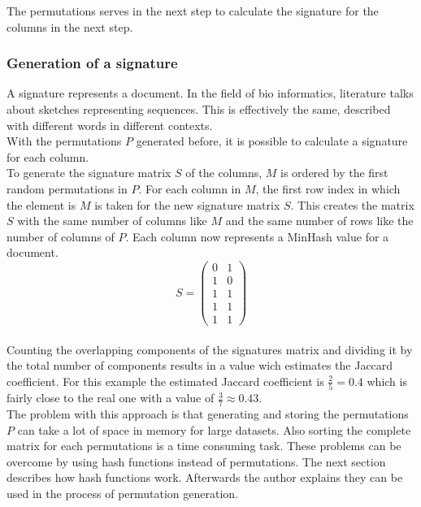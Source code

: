 The permutations serves in the next step to calculate the signature for the columns in the next step.\\

\subsubsection{Generation of a signature}

A signature represents a document. In the field of bio informatics, literature talks about sketches representing sequences. This is effectively the same, described with different words in different contexts.\\

With the permutations $ P $ generated before, it is possible to calculate a signature for each column.\\

To generate the signature matrix $ S $ of the columns, $ M $ is ordered by the first random permutations in $ P $. For each column in $ M $, the first row index in which the element is $ M $ is taken for the new signature matrix $ S $. This creates the matrix $ S $ with the same number of columns like $ M $ and the same number of rows like the number of columns of $ P $. Each column now represents a MinHash value for a document.\\

\begin{equation}
    S = 
    \begin{pmatrix}
        0 & 1 \\
        1 & 0 \\
        1 & 1 \\
        1 & 1 \\
        1 & 1
    \end{pmatrix}
\end{equation} \\

Counting the overlapping components of the signatures matrix and dividing it by the total number of components results in a value wich estimates the Jaccard coefficient. For this example the estimated Jaccard coefficient is $ \frac{2}{5} = 0.4 $ which is fairly close to the real one with a value of $ \frac{3}{7} \approx 0.43 $.\\

The problem with this approach is that generating and storing the permutations $ P $ can take a lot of space in memory for large datasets. Also sorting the complete matrix for each permutations is a time consuming task. These problems can be overcome by using hash functions instead of permutations. The next section describes how hash functions work. Afterwards the author explains they can be used in the process of permutation generation.\\

